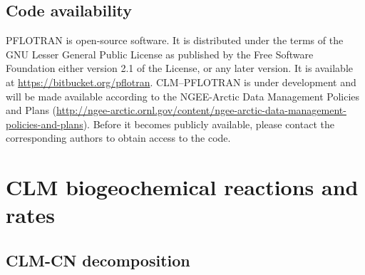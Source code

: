 \documentclass[gmd,noline]{copernicus}
\begin{document}
\hack{\newpage}
\subsection*{Code availability}
PFLOTRAN is open-source
      software. It is distributed under the terms of the GNU Lesser General
      Public License as published by the Free Software Foundation either
      version 2.1 of the License, or any later version. It is available at
      \url{https://bitbucket.org/pflotran}. CLM--PFLOTRAN is under
      development and will be made available according to the NGEE-Arctic
      Data Management Policies and Plans
      (\url{http://ngee-arctic.ornl.gov/content/ngee-arctic-data-management-policies-and-plans}).
      Before it becomes publicly available, please contact the corresponding
      authors to obtain access to the code.



\hack{\clearpage}

\appendix

\section{CLM biogeochemical reactions and rates}%
\label{sec:clmbgc}


\subsection{CLM-CN decomposition}%
\label{section:bgc}
\end{document}
